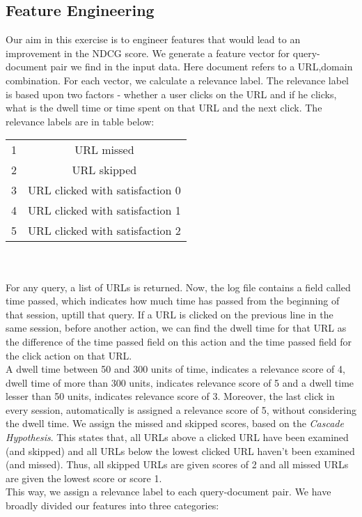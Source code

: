 \documentclass[11pt,letterpaper]{article}
\begin{document}
\subsection{Feature Engineering}
Our aim in this exercise is to engineer features that would lead to an improvement in the NDCG score. We generate a feature vector for query-document pair we find in the input data. Here document refers to a URL,domain combination. For each vector, we calculate a relevance label. The relevance label is based upon two factors - whether a user clicks on the URL and if he clicks, what is the dwell time or time spent on that URL and the next click. The relevance labels are in table below:
\begin{tabular}{l | c} 
1 & URL missed\\
2 & URL skipped\\
3 & URL clicked with satisfaction 0\\
4 & URL clicked with satisfaction 1\\
5 & URL clicked with satisfaction 2 \\
\end{tabular}\\
\\
For any query, a list of URLs is returned. Now, the log file contains a field called time passed, which indicates how much time has passed from the beginning of that session, uptill that query. If a URL is clicked on the previous line in the same session, before another action, we can find the dwell time for that URL as  the difference of the time passed field on this action and the time passed field for the click action on that URL.\\
A dwell time between 50 and 300 units of time, indicates a relevance score of 4, dwell time of more than 300 units, indicates relevance score of 5 and a dwell time lesser than 50 units, indicates relevance score of 3. Moreover, the last click in every session, automatically is assigned a relevance score of 5, without considering the dwell time. We assign the missed and skipped scores, based on the \textit{Cascade Hypothesis}. This states that, all URLs above a clicked URL have been examined (and skipped) and all URLs below the lowest clicked URL haven't been examined (and missed). Thus, all skipped URLs are given scores of 2 and all missed URLs are given the lowest score or score 1.\\
This way, we assign a relevance label to each query-document pair.  
We have broadly divided our features into three categories:\\
\end{document}

